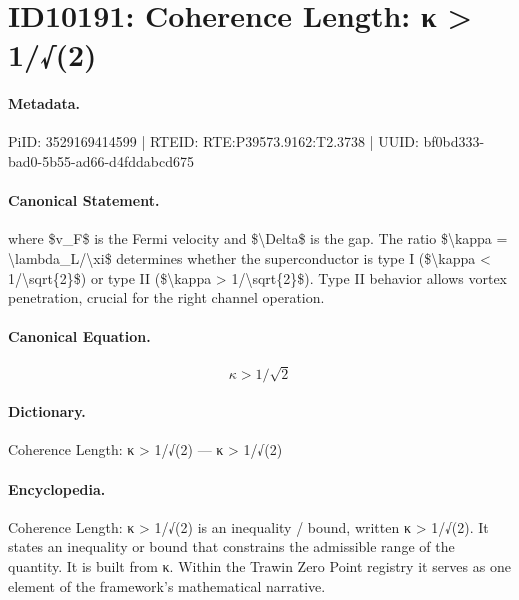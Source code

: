 \section*{ID10191: Coherence Length: κ > 1/√(2)}
\paragraph{Metadata.}
PiID: 3529169414599 | RTEID: RTE:P39573.9162:T2.3738 | UUID: bf0bd333-bad0-5b55-ad66-d4fddabcd675

\paragraph{Canonical Statement.}
where \$v\_F\$ is the Fermi velocity and \$\textbackslash{}Delta\$ is the gap. The ratio \$\textbackslash{}kappa = \textbackslash{}lambda\_L/\textbackslash{}xi\$ determines whether the superconductor is type I (\$\textbackslash{}kappa < 1/\textbackslash{}sqrt\{2\}\$) or type II (\$\textbackslash{}kappa > 1/\textbackslash{}sqrt\{2\}\$). Type II behavior allows vortex penetration, crucial for the right channel operation.

\paragraph{Canonical Equation.}
\[
\kappa > 1/\sqrt{2}
\]

\paragraph{Dictionary.}
Coherence Length: κ > 1/√(2) — κ > 1/√(2)

\paragraph{Encyclopedia.}
Coherence Length: κ > 1/√(2) is an inequality / bound, written κ > 1/√(2). It states an inequality or bound that constrains the admissible range of the quantity. It is built from κ. Within the Trawin Zero Point registry it serves as one element of the framework's mathematical narrative.

